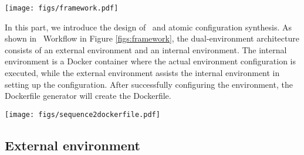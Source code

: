 \begin{figure*}[ht!]
	\centering
	\texttt{[image: figs/framework.pdf]}
    
    \caption{An example process of \textbf{\tool}, which illustrates two main parts: \textbf{Event Stream} and \textbf{\tool}~\textbf{Workflow}. The Event Stream tracks the entire action-observation process, where green boxes represent system prompts, yellow boxes represent responses from the LLM agent including the actions, and blue boxes represent observations from the Runtime Environment. The shaded actions indicate configurations abandoned after \textbf{base image change}. In the Event Stream, the blue text indicates that the command starts running, the green text indicates that the command runs successfully, and the red text indicates that the command fails. The \textbf{\tool}~\textbf{Workflow} consists of the \textbf{internal environment} and the \textbf{external environment}. The internal environment serves as the actual configuration Docker-based sandbox, which builds an actual testing runtime environment. The external environment executes the action-observation process and assists in the configuration process within the internal environment.}
\label{figs:framework}
\end{figure*}


In this part, we introduce the design of \tool~and atomic configuration synthesis. As shown in \tool~Workflow in Figure \ref{figs:framework}, the dual-environment architecture consists of an external environment and an internal environment. The internal environment is a Docker container where the actual environment configuration is executed, while the external environment assists the internal environment in setting up the configuration. After successfully configuring the environment, the Dockerfile generator will create the Dockerfile.

\begin{figure*}[ht!]
	\centering
	\texttt{[image: figs/sequence2dockerfile.pdf]}
    
    \caption{An example of the Dockerfile generator to transfer the commands into a runnable Dockerfile.}
\label{figs:sequence2dockerfile}
\end{figure*}

\subsection{External environment}

